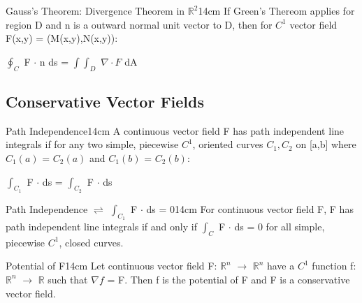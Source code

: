     \begin{wtheorem}{Gauss's Theorem: Divergence Theorem in $\mathbb{R}^2$}{14cm}
        If Green's Thereom applies for region D and n is a outward normal
        unit vector to D, then for $C^1$ vector field F(x,y) = (M(x,y),N(x,y)):

        \hspace{0.5cm}
        $\oint_C$ F $\cdot$ n ds
        = $\int \int_D$ $\nabla \cdot F$ dA
        
    \end{wtheorem}

    \vspace{0.5cm}





\subsection{ Conservative Vector Fields }

    \begin{definition}{Path Independence}{14cm}
        A continuous vector field F has {\color{lblue} path independent}
        line integrals if for any two simple, piecewise $C^1$, oriented curves
        $C_1,C_2$ on [a,b] where $C_1(a)$ = $C_2(a)$
        and $C_1(b)$ = $C_2(b)$:

        \hspace{0.5cm}
        $\int_{C_1}$ F $\cdot$ ds = $\int_{C_2}$ F $\cdot$ ds
    \end{definition}

    \vspace{0.5cm}



    \begin{wtheorem}{Path Independence $\rightleftharpoons$
    $\int_{C_1}$ F $\cdot$ ds = 0}{14cm}
        For continuous vector field F, F has path independent line integrals
        if and only if $\int_{C}$ F $\cdot$ ds = 0
        for all simple, piecewise $C^1$, closed curves.
    \end{wtheorem}

    \vspace{0.5cm}



    \begin{definition}{Potential of F}{14cm}
        Let continuous vector field F: $\mathbb{R}^n$ $\rightarrow$ $\mathbb{R}^n$
        have a $C^1$ function f: $\mathbb{R}^n$ $\rightarrow$ $\mathbb{R}$
        such that $\nabla f$ = F.
        Then f is the {\color{lblue} potential} of F
        and F is a {\color{lblue} conservative vector field}.
    \end{definition}


